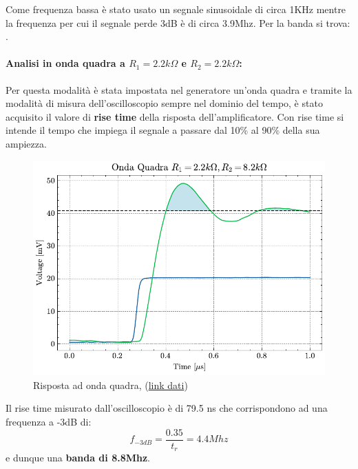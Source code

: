 Come frequenza bassa è stato usato un segnale sinusoidale di circa 1KHz mentre la frequenza per cui il segnale perde 3dB è di circa 3.9Mhz.
Per la banda si trova: .

\paragraph{Analisi in onda quadra a $R_1=2.2k\Omega$ e $R_2=2.2k\Omega$:}

Per questa modalità è stata impostata nel generatore un'onda quadra e tramite la modalità di misura dell'oscilloscopio sempre nel dominio del tempo, è stato acquisito il valore di \textbf{rise time} della risposta dell'amplificatore. Con rise time si intende il tempo che impiega il segnale a passare dal 10\% al 90\% della sua ampiezza.

\begin{figure}[!h]
    \centering
    \includegraphics[width=0.5\linewidth]{analog/assets/OP27/Non Invertente/Square_2k2.pdf}
    \caption{Risposta ad onda quadra, (\href{https://github.com/Yedi278/Esperimentazioni-Elettronica/tree/main/-\%20OPAMP/OP27/Non-Invertente/R1\%3D2.2k\%2CR2\%3D2.2k}{link dati})}
\end{figure}
\pagebreak

Il rise time misurato dall'oscilloscopio è di 79.5 ns che corrispondono ad una frequenza a -3dB di:
$$f_{-3dB} = \frac{0.35}{t_r} = 4.4Mhz$$ e dunque una \textbf{banda di 8.8Mhz}.




